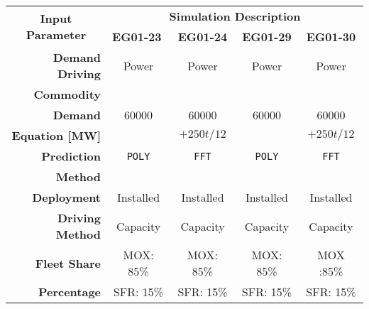 \begin{table}[]
	\centering
	\begin{tabular}{r|cccc}
	\hline
	\multicolumn{1}{c|}{\multirow{2}{*}{\textbf{Input Parameter}}} & \multicolumn{4}{c}{\textbf{Simulation Description}}                                                                                                                                                                                                                                                       \\ \cline{2-5}
	\multicolumn{1}{c|}{}                                          & \multicolumn{1}{l}{\textbf{EG01-23}}                                                                 & \textbf{EG01-24}                  & \textbf{EG01-29}                 &\textbf{EG01-30}                                                  \\ \hline
	\textbf{Demand Driving}                                      & Power & Power & Power & Power                                                                                                                                                                                                                                                                                \\ 
	\textbf{Commodity} \\ \hline  
	\textbf{Demand}                                               & 60000                                                                                & 60000 & 60000                     &  60000                                        \\ 
	\textbf{Equation [MW]} & &$+250t/12$& &$+250t/12$ \\ \hline 
	\textbf{Prediction}                                             & \texttt{POLY}       & \texttt{FFT}             & \texttt{POLY}         &  \texttt{FFT}    \\ 
	\textbf{Method} \\ \hline 
	\textbf{Deployment}   & Installed & Installed  & Installed   & Installed    \\                                                                                                                                                                                 
	\textbf{Driving Method} & Capacity & Capacity  & Capacity   & Capacity \\ \hline 
	\textbf{Fleet Share} &  MOX: 85\% &  MOX: 85\% &  MOX: 85\% &  MOX :85\%     \\
	\textbf{Percentage} &SFR: 15\%&SFR: 15\%&SFR: 15\%&SFR: 15\%\\ \hline

\end{tabular}
\end{table}
